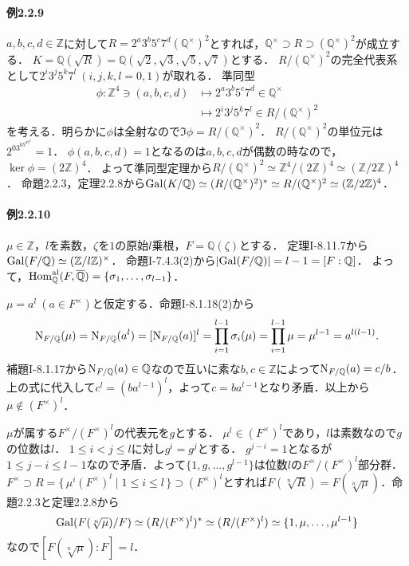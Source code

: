 \paragraph{例2.2.9}
$a, b, c, d\in\mathbb{Z}$に対して$R=2^a3^b5^c7^d(\mathbb{Q}^\times)^2$とすれば，$\mathbb{Q}^\times\supset R\supset(\mathbb{Q}^\times)^2$が成立する．
$K=\mathbb{Q}(\sqrt{R})=\mathbb{Q}(\sqrt{2}, \sqrt{3}, \sqrt{5}, \sqrt{7})$とする．
$R/(\mathbb{Q}^\times)^2$の完全代表系として$2^i3^j5^k7^l\ (i, j, k, l=0, 1)$が取れる．
準同型
\begin{align*}
  \phi\colon\mathbb{Z}^4\ni(a, b, c, d) &\mapsto 2^a3^b5^c7^d\in\mathbb{Q}^\times\\
  &\mapsto 2^i3^j5^k7^l\in R/(\mathbb{Q}^\times)^2
\end{align*}
を考える．明らかに$\phi$は全射なので$\Im\phi=R/(\mathbb{Q}^\times)^2$．
$R/(\mathbb{Q}^\times)^2$の単位元は$2^03^05^07^0=1$．
$\phi(a, b, c, d)=1$となるのは$a, b, c, d$が偶数の時なので，$\ker\phi=(2\mathbb{Z})^4$．
よって準同型定理から$R/(\mathbb{Q}^\times)^2\simeq\mathbb{Z}^4/(2\mathbb{Z})^4\simeq(\mathbb{Z}/2\mathbb{Z})^4$．
命題2.2.3，定理2.2.8から$\operatorname{Gal}(K/\mathbb{Q})\simeq(R/(\mathbb{Q}^\times)^2)^\ast\simeq R/(\mathbb{Q}^\times)^2\simeq(\mathbb{Z}/2\mathbb{Z})^4$．

\paragraph{例2.2.10}
$\mu\in\mathbb{Z}$，$l$を素数，$\zeta$を$1$の原始$l$乗根，$F=\mathbb{Q}(\zeta)$とする．
定理I-8.11.7から$\operatorname{Gal}(F/\mathbb{Q})\simeq(\mathbb{Z}/l\mathbb{Z})^\times$．
命題I-7.4.3(2)から$\lvert\operatorname{Gal}(F/\mathbb{Q})\rvert=l-1=[F:\mathbb{Q}]$．
よって，$\operatorname{Hom}_\mathbb{Q}^\text{al}(F, \overline{\mathbb{Q}})=\{\sigma_1, \ldots, \sigma_{l-1}\}$．

$\mu=a^l\ (a\in F^\times)$と仮定する．命題I-8.1.18(2)から
\[\operatorname{N}_{F/\mathbb{Q}}(\mu)=\operatorname{N}_{F/\mathbb{Q}}(a^l)=[\operatorname{N}_{F/\mathbb{Q}}(a)]^l=\prod_{i=1}^{l-1}\sigma_i(\mu)=\prod_{i=1}^{l-1}\mu=\mu^{l-1}=a^{l(l-1)}.\]
補題I-8.1.17から$\operatorname{N}_{F/\mathbb{Q}}(a)\in\mathbb{Q}$なので互いに素な$b, c\in\mathbb{Z}$によって$\operatorname{N}_{F/\mathbb{Q}}(a)=c/b$．
上の式に代入して$c^l=(ba^{l-1})^l$，よって$c=ba^{l-1}$となり矛盾．以上から$\mu\not\in(F^\times)^l$．

$\mu$が属する$F^\times/(F^\times)^l$の代表元を$g$とする．
$\mu^l\in(F^\times)^l$であり，$l$は素数なので$g$の位数は$l$．
$1\leq i< j\leq l$に対し$g^i=g^j$とする．
$g^{j-i}=1$となるが$1\leq j-i\leq l-1$なので矛盾．よって$\{1, g, \ldots, g^{l-1}\}$は位数$l$の$F^\times/(F^\times)^l$部分群．
$F^\times\supset R=\{\, \mu^i(F^\times)^l\mid1\leq i\leq l\, \}\supset(F^\times)^l$とすれば$F(\sqrt[n]{R})=F(\sqrt[n]{\mu})$．命題2.2.3と定理2.2.8から
\[\operatorname{Gal}(F(\sqrt[n]{\mu})/F)\simeq(R/(F^\times)^l)^\ast\simeq(R/(F^\times)^l)\simeq\{1, \mu, \ldots, \mu^{l-1}\}\]
なので$[F(\sqrt[n]{\mu}):F]=l$．

